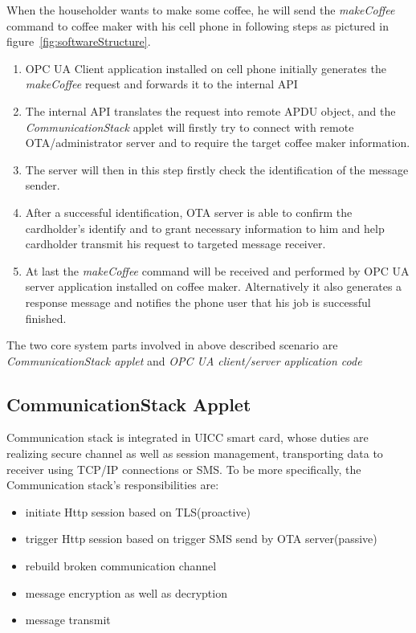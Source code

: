 When the householder wants to make some coffee, he will send the \emph{makeCoffee} command to coffee maker with his cell phone in following steps as pictured in figure~\ref{fig:softwareStructure}. 
\begin{enumerate}
\item OPC UA Client application installed on cell phone initially generates the \emph{makeCoffee} request and forwards it to the internal API
\item The internal API translates the request into remote APDU object, and the \emph{CommunicationStack} applet will firstly try to connect with remote OTA/administrator server and to require the target coffee maker information.
\item The server will then in this step firstly check the identification of the message sender.
\item After a successful identification, OTA server is able to confirm the cardholder's identify and to grant necessary information to him and help cardholder transmit his request to targeted message receiver.
\item  At last the \emph{makeCoffee} command will be received and performed by OPC UA server application installed on coffee maker. Alternatively it also generates a response message and notifies the phone user that his job is successful  finished. 
\end{enumerate}
The two core system parts involved in above described scenario are \emph{CommunicationStack applet} and \emph{OPC UA client/server application code} 

\subsection{CommunicationStack Applet}
Communication stack is integrated in UICC smart card, whose duties are realizing secure channel as well as session management, transporting data to receiver using TCP/IP connections or SMS. To be more specifically, the Communication stack's responsibilities are:
\begin{itemize}
  \item initiate Http session based on TLS(proactive)
  \item trigger Http session based on trigger SMS send by OTA server(passive)
  \item rebuild broken communication channel
  \item message encryption as well as decryption
  \item message transmit
\end{itemize}


